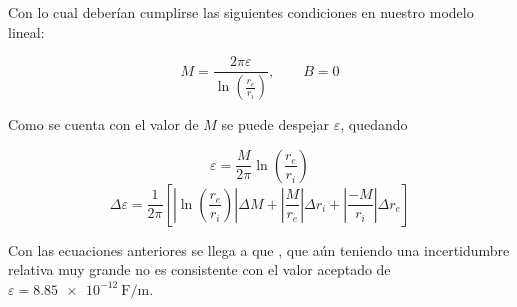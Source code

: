 \vspace{5mm}
Con lo cual deberían cumplirse las siguientes condiciones en nuestro modelo
lineal:

\[
    M = \frac{2\pi\varepsilon}{\ln\left(\frac{r_e}{r_i}\right)}, 
    \quad\quad B = 0
\]

\vspace{5mm}
Como se cuenta con el valor de $M$ se puede despejar $\varepsilon$, quedando

\begin{equation}
    \label{ec:epsilon:epsilon}
    \varepsilon = \frac{M}{2\pi} \ln \left(\frac{r_e}{r_i}\right)
\end{equation}
\vspace{5mm}
\begin{equation}
    \label{ec:epsilon:error-epsilon}
    \Delta \varepsilon = \frac{1}{2\pi} \left[ 
            \left| \ln\left(\frac{r_e}{r_i}\right) \right| \Delta M +
            \left| \frac{M}{r_e} \right| \Delta r_i + 
            \left| \frac{-M}{r_i} \right| \Delta r_e
        \right]
\end{equation}

\vspace{5mm}
Con las ecuaciones anteriores se llega a que , que
aún teniendo una incertidumbre relativa muy grande no es consistente con el
valor aceptado de $\varepsilon = \SI{8.85e-12}{\farad\per\meter}$.

